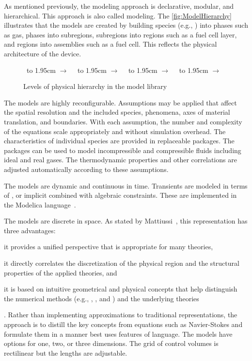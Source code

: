 As mentioned previously, the modeling approach is declarative, modular, and hierarchical.  This approach is also called  modeling.  The \autoref{fig:ModelHierarchy} illustrates that the models are created by building species (e.g., ) into phases such as gas, phases into subregions, subregions into regions such as a fuel cell layer, and regions into assemblies such as a fuel cell.  This reflects the physical architecture of the device.
\begin{figure}[htbp]
  \newcommand{\I}[1]{\fbox{\texttt{[image: \#1]}}}
  \newcommand{\arrow}{\vbox to 1.95cm {\vfil
    \hbox{\LARGE $\rightarrow$}
    \vfil}}
  \I{4-SpeciesI}~\arrow~\I{4-PhaseI}~\arrow~\I{4-SubregionI}~\arrow~~\arrow~\I{4-AssemblyI}%
  \caption{Levels of physical hierarchy in the model library}%
  \label{fig:ModelHierarchy}%
\end{figure}

The models are highly reconfigurable.  Assumptions may be applied that affect the spatial resolution and the included species, phenomena, axes of material translation, and boundaries.  With each assumption, the number and complexity of the equations scale appropriately and without simulation overhead.  The characteristics of individual species are provided in replaceable packages.  The packages can be used to model incompressible and compressible fluids including ideal and real gases.  The thermodynamic properties and other correlations are adjusted automatically according to these assumptions.

The models are dynamic and continuous in time.  Transients are modeled in terms of , or implicit  combined with algebraic constraints.  These  are implemented in the Modelica language~\cite{Modelica3.3}.

The models are discrete in space.  As stated by Mattiussi~\cite{Mattiussi2000}, %
this representation has three advantages: \begin{inparaenum}[(1)]\item it provides a unified perspective that is appropriate for many theories, \item it directly correlates the discretization of the physical region and the structural properties of the applied theories, and \item it is based on intuitive geometrical and physical concepts that help distinguish the numerical methods (e.g., , , and ) and the underlying theories\end{inparaenum}.  Rather than implementing approximations to traditional  representations, the approach is to distill the key concepts from equations such as Navier-Stokes and formulate them in a manner best uses features of  language.  The models have options for one, two, or three dimensions.  The grid of control volumes is rectilinear but the lengths are adjustable.

